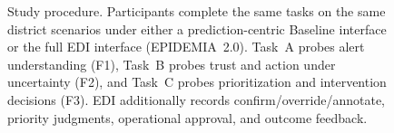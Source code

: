 \begin{figure}[t]
\caption{Study procedure. Participants complete the same tasks on the same district scenarios under either a prediction-centric Baseline interface or the full EDI interface (EPIDEMIA~2.0). Task~A probes alert understanding (F1), Task~B probes trust and action under uncertainty (F2), and Task~C probes prioritization and intervention decisions (F3). EDI additionally records confirm/override/annotate, priority judgments, operational approval, and outcome feedback.}
\label{fig:study-procedure}
\end{figure}
